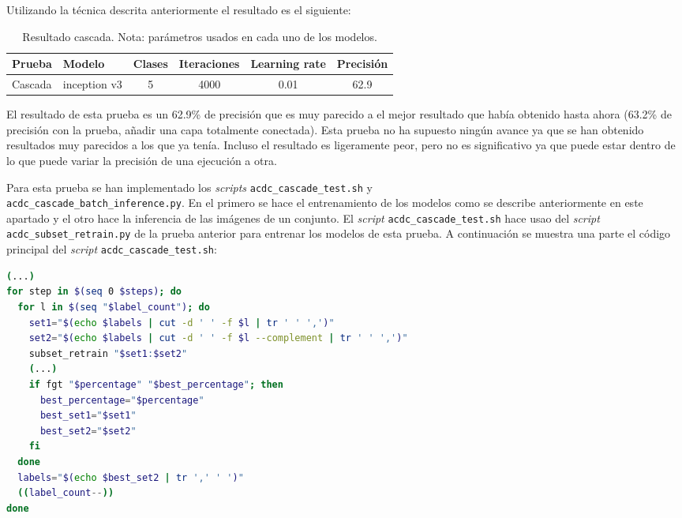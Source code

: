\documentclass[12pt,a4paper]{article}
\begin{document}
Utilizando la técnica descrita anteriormente el resultado es el siguiente:

\begin{table}[H]
\centering
\begin{tabular}{|l|l|l|l|l|l|}
\hline
\textbf{Prueba} & \textbf{Modelo}                   & \textbf{Clases}        & \textbf{Iteraciones}      & \textbf{Learning rate}    & \textbf{Precisión}        \\ \hline
Cascada         & \multicolumn{1}{c|}{inception v3} & \multicolumn{1}{c|}{5} & \multicolumn{1}{c|}{4000} & \multicolumn{1}{c|}{0.01} & \multicolumn{1}{c|}{62.9} \\ \hline
\end{tabular}
\caption{Resultado cascada. Nota: parámetros usados en cada uno de los modelos.}
\end{table}

El resultado de esta prueba es un 62.9\% de precisión que es muy parecido a el mejor resultado que había obtenido hasta ahora (63.2\% de precisión con la prueba, añadir una capa totalmente conectada). Esta prueba no ha supuesto ningún avance ya que se han obtenido resultados muy parecidos a los que ya tenía. Incluso el resultado es ligeramente peor, pero no es significativo ya que puede estar dentro de lo que puede variar la precisión de una ejecución a otra.
\bigskip

Para esta prueba se han implementado los \textit{scripts} \texttt{acdc\_cascade\_test.sh} y \\ \texttt{acdc\_cascade\_batch\_inference.py}. En el primero se hace el entrenamiento de los modelos como se describe anteriormente en este apartado y el otro hace la inferencia de las imágenes de un conjunto. El \textit{script} \texttt{acdc\_cascade\_test.sh} hace usao del \textit{script} \texttt{acdc\_subset\_retrain.py} de la prueba anterior para entrenar los modelos de esta prueba. A continuación se muestra una parte el código principal del \textit{script} \texttt{acdc\_cascade\_test.sh}:

\begin{lstlisting}[language=Bash]
(...)
for step in $(seq 0 $steps); do
  for l in $(seq "$label_count"); do
    set1="$(echo $labels | cut -d ' ' -f $l | tr ' ' ',')"
    set2="$(echo $labels | cut -d ' ' -f $l --complement | tr ' ' ',')"
    subset_retrain "$set1:$set2"
    (...)
    if fgt "$percentage" "$best_percentage"; then
      best_percentage="$percentage"
      best_set1="$set1"
      best_set2="$set2"
    fi
  done
  labels="$(echo $best_set2 | tr ',' ' ')"
  ((label_count--))
done
\end{lstlisting}
\end{document}
